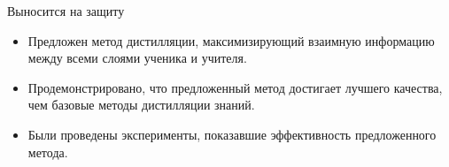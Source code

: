 \documentclass{beamer}
\begin{document}
\begin{frame}{Выносится на защиту}
    \begin{itemize}
        \item Предложен метод дистилляции, максимизирующий взаимную информацию между всеми слоями ученика и учителя.
        \item Продемонстрировано, что предложенный метод достигает лучшего качества, чем базовые методы дистилляции знаний.
        \item Были проведены эксперименты, показавшие эффективность предложенного метода.
    \end{itemize}
\end{frame}

\end{document}
